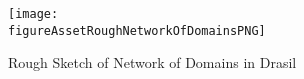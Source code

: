 \begin{figure}
	\centering
	\caption{Rough Sketch of Network of Domains in Drasil}
	\label{fig:roughNetworkOfDomains}

	\texttt{[image: \\figureAssetRoughNetworkOfDomainsPNG]}
\end{figure}
